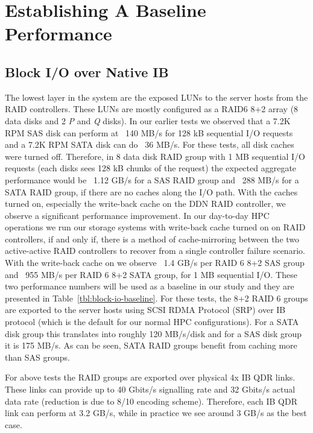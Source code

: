 \section{Establishing A Baseline Performance}
\label{sec:baseline}

\subsection{Block I/O over Native IB} 
\label{sec:block-io}

The lowest layer in the system are the exposed LUNs to the server hosts from
the RAID controllers.  These LUNs are mostly configured as a RAID6 8+2 array (8
data disks and 2 \textit{P} and \textit{Q} disks). In our earlier tests we
observed that a 7.2K RPM SAS disk can perform at ~140 MB/s for 128 kB
sequential I/O requests and a 7.2K RPM SATA disk can do ~36 MB/s. For these
tests, all disk caches were turned off. Therefore, in 8 data disk RAID group
with 1 MB sequential I/O requests (each disks sees 128 kB chunks of the
request) the expected aggregate performance would be ~1.12 GB/s for a SAS RAID
group and ~288 MB/s for a SATA RAID group, if there are no caches along the I/O
path.  With the caches turned on, especially the write-back cache on the DDN
RAID controller, we observe a significant performance improvement. In our
day-to-day HPC operations we run our storage systems with write-back cache
turned on on RAID controllers, if and only if, there is a method of
cache-mirroring between the two active-active RAID controllers to recover from
a single controller failure scenario. With the write-back cache on we observe
~1.4 GB/s per RAID 6 8+2 SAS group and ~955 MB/s per RAID 6 8+2 SATA group, for
1 MB sequential I/O. These two performance numbers will be used as a baseline
in our study and they are presented in Table~\ref{tbl:block-io-baseline}.  For
these tests, the 8+2 RAID 6 groups are exported to the server hosts using SCSI
RDMA Protocol (SRP) over IB protocol (which is the default for our normal HPC
configurations). For a SATA disk group this translates into roughly 120
MB/s/disk and for a SAS disk group it is 175 MB/s. As can be seen, SATA RAID
groups benefit from caching more than SAS groups. 

For above tests the RAID groups are exported over physical 4x IB QDR links.
These links can provide up to 40 Gbits/s signalling rate and 32 Gbits/s actual
data rate (reduction is due to 8/10 encoding scheme). Therefore, each IB QDR
link can perform at 3.2 GB/s, while in practice we see around 3 GB/s as the
best case. 

